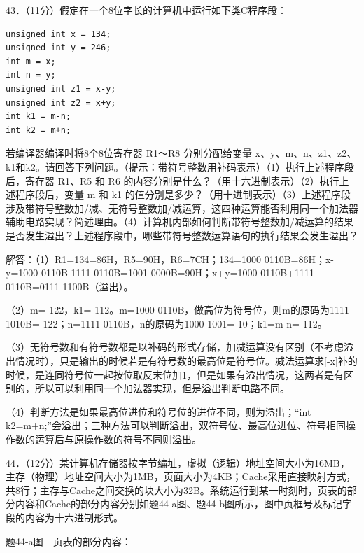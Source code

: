 \documentclass[UTF8,11pt]{ctexart}
\begin{document}
43．（11分）假定在一个8位字长的计算机中运行如下类C程序段：


\begin{Verbatim}[breaklines,breakanywhere,fontsize=\small]
unsigned int x = 134;
unsigned int y = 246;
int m = x;
int n = y;
unsigned int z1 = x-y;
unsigned int z2 = x+y;
int k1 = m-n;
int k2 = m+n;
\end{Verbatim}

若编译器编译时将8个8位寄存器 R1～R8 分别分配给变量 x、y、m、n、z1、z2、k1和k2。请回答下列问题。（提示：带符号整数用补码表示）（1）执行上述程序段后，寄存器 R1、R5 和 R6 的内容分别是什么？（用十六进制表示）（2）执行上述程序段后，变量 m 和 k1 的值分别是多少？（用十进制表示）（3）上述程序段涉及带符号整数加/减、无符号整数加/减运算，这四种运算能否利用同一个加法器辅助电路实现？简述理由。（4）计算机内部如何判断带符号整数加/减运算的结果是否发生溢出？上述程序段中，哪些带符号整数运算语句的执行结果会发生溢出？


解答：（1）R1=134=86H，R5=90H，R6=7CH；134=1000 0110B=86H；x-y=1000 0110B-1111 0110B=1001 0000B=90H；x+y=1000 0110B+1111 0110B=0111 1100B（溢出）。


（2）m=-122，k1=-112。m=1000 0110B，做高位为符号位，则m的原码为1111 1010B=-122；n=1111 0110B，n的原码为1000 1001=-10；k1=m-n=-112。


（3）无符号数和有符号数都是以补码的形式存储，加减运算没有区别（不考虑溢出情况时），只是输出的时候若是有符号数的最高位是符号位。减法运算求[-x]补的时候，是连同符号位一起按位取反末位加1，但是如果有溢出情况，这两者是有区别的，所以可以利用同一个加法器实现，但是溢出判断电路不同。


（4）判断方法是如果最高位进位和符号位的进位不同，则为溢出；“int k2=m+n;”会溢出；三种方法可以判断溢出，双符号位、最高位进位、符号相同操作数的运算后与原操作数的符号不同则溢出。


44．（12分）某计算机存储器按字节编址，虚拟（逻辑）地址空间大小为16MB，主存（物理）地址空间大小为1MB，页面大小为4KB；Cache采用直接映射方式，共8行；主存与Cache之间交换的块大小为32B。系统运行到某一时刻时，页表的部分内容和Cache的部分内容分别如题44-a图、题44-b图所示，图中页框号及标记字段的内容为十六进制形式。


题44-a图　页表的部分内容：
\end{document}
